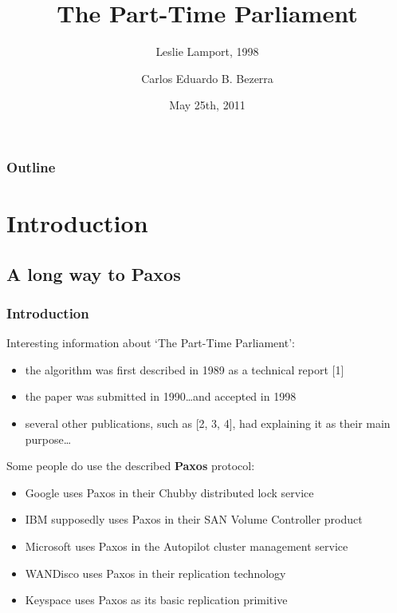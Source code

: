 \documentclass[10 pt]{beamer}
\title[{\makebox[.45\paperwidth]{The Part-Time Parliament\hfill\insertframenumber/\inserttotalframenumber}}]{The Part-Time Parliament}
\subtitle{Leslie Lamport, 1998}
\author{Carlos Eduardo B. Bezerra}
\institute[Universities of]
{
Faculty of Informatics\\
Universittà della Svizzera italiana
}
\date{May 25th, 2011}
\begin{document}
\begin{frame}
  \titlepage
\end{frame}



\begin{frame}
  \frametitle{Outline}
  \tableofcontents
\end{frame}



\section{Introduction}

\subsection{A long way to Paxos}

\begin{frame}
  \frametitle{Introduction}

  Interesting information about `The Part-Time Parliament':
  
  \begin{itemize}
    \item the algorithm was first described in 1989 as a technical report [1]
    \item the paper was submitted in 1990\ldots and accepted in 1998%
    \item several other publications, such as [2, 3, 4], had explaining it as their main purpose\ldots
  \end{itemize}
  
  \vspace{3mm}
  
  \pause
  
  Some people do use the described \textbf{Paxos} protocol: %

  \begin{itemize}
    \item Google uses Paxos in their Chubby distributed lock service
    \item IBM supposedly uses Paxos in their SAN Volume Controller product
    \item Microsoft uses Paxos in the Autopilot cluster management service
    \item WANDisco uses Paxos in their replication technology
    \item Keyspace uses Paxos as its basic replication primitive
  \end{itemize}

\end{frame}
\end{document}
